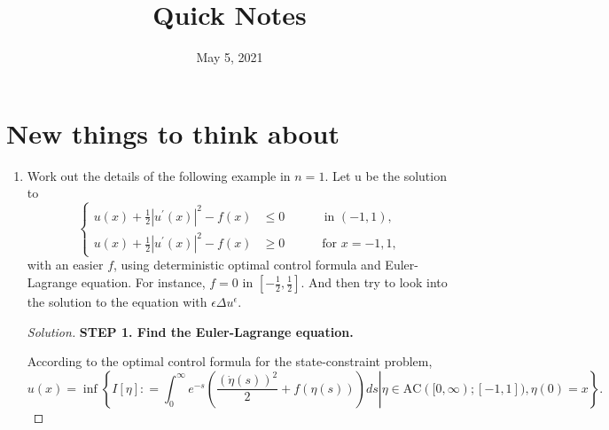 \documentclass[english,reqno]{amsart}
\title{Quick Notes}
\newenvironment{solution}
  {\renewcommand\qedsymbol{$\blacksquare$}\begin{proof}[Solution]}
  {\end{proof}}
\begin{document}
\maketitle
\date{May 5, 2021}
\section{New things to think about}
\begin{enumerate}[label=\arabic*)]
    \item Work out the details of the following example in $n=1$.
    Let u be the solution to
    \begin{equation}
    \label{example}
        \left\{
  \begin{aligned}
   u(x) + \frac{1}{2}|u^\prime(x)|^2 -f(x) &\leq 0 \, \quad \qquad \text{in } (-1, 1), \\
              u(x) + \frac{1}{2}|u^\prime (x)|^2 -f(x) &\geq 0 \qquad  \quad \text{for } x=-1, 1,
  \end{aligned}
\right.
    \end{equation}
    with an easier $f$, using deterministic optimal control formula and Euler-Lagrange equation. For instance, $f=0$ in $[-\frac{1}{2}, \frac{1}{2}]$. And then try to look into the solution to the equation with $\epsilon \Delta u^\epsilon$.
    
 \begin{solution}
\textbf{STEP 1. Find the Euler-Lagrange equation.} 


According to the optimal control formula for the state-constraint problem,
\begin{equation}
\label{ocf}
    u(x)=\inf \left\{ \left.I[\eta]: =\int_0^\infty e^{-s} \left( \frac{\left( \dot{\eta}(s) \right)^2}{2} + f(\eta (s)) \right)ds \right| \eta \in \mathrm{AC}([0, \infty); [-1,1]), \eta(0)=x \right\}.
\end{equation}




\end{solution}
\end{enumerate}
\end{document}
